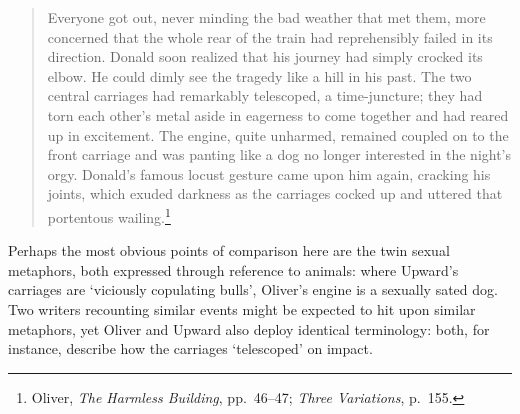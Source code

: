 \documentclass[]{article}
\begin{document}
\begin{quote}
\singlespacing Everyone got out, never minding the bad weather that met
them, more concerned that the whole rear of the train had reprehensibly
failed in its direction. Donald soon realized that his journey had
simply crocked its elbow. He could dimly see the tragedy like a hill in
his past. The two central carriages had remarkably telescoped, a
time-juncture; they had torn each other’s metal aside in eagerness to
come together and had reared up in excitement. The engine, quite
unharmed, remained coupled on to the front carriage and was panting like
a dog no longer interested in the night’s orgy. Donald’s famous locust
gesture came upon him again, cracking his joints, which exuded darkness
as the carriages cocked up and uttered that portentous
wailing.\footnote{Oliver, \emph{The Harmless Building}, pp.~46–47;
  \emph{Three Variations}, p.~155.}
\end{quote}

\noindent Perhaps the most obvious points of comparison here are the
twin sexual metaphors, both expressed through reference to animals:
where Upward’s carriages are ‘viciously copulating bulls’, Oliver’s
engine is a sexually sated dog. Two writers recounting similar events
might be expected to hit upon similar metaphors, yet Oliver and Upward
also deploy identical terminology: both, for instance, describe how the
carriages ‘telescoped’ on impact.
\end{document}
